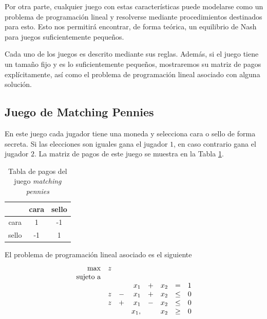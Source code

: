Por otra parte, cualquier juego con estas características puede modelarse como un problema de programación lineal \cite[pp.~228-233]{bib:pl-chvatal} y resolverse mediante procedimientos destinados para esto. Esto nos permitirá encontrar, de forma teórica, un equilibrio de Nash para juegos suficientemente pequeños.

Cada uno de los juegos es descrito mediante sus reglas. Además, si el juego tiene un tamaño fijo y es lo suficientemente pequeños, mostraremos su matriz de pagos explícitamente, así como el problema de programación lineal asociado con alguna solución.

\subsection*{Juego de Matching Pennies}

En este juego cada jugador tiene una moneda y selecciona cara o sello de forma secreta. Si las elecciones son iguales gana el jugador $1$, en caso contrario gana el jugador $2$. La matriz de pagos de este juego se muestra en la Tabla \ref{table:pagos-matching-pennies}.

\begin{table}[ht]
\begin{center}
\caption[Tabla de pagos del juego matching pennies]{Tabla de pagos del juego \textit{matching pennies}}
\label{table:pagos-matching-pennies}
\begin{tabular}{ c | c | c |}
 & cara & sello  \\ \hline
 cara  &  1 & -1 \\ \hline
 sello & -1 &  1 \\ \hline
\end{tabular}
\end{center}
\end{table}

El problema de programación lineal asociado es el siguiente
\begin{equation}
\begin{array}{r r r r r r r r}
\max  & z &  & & & & &\\
\text{sujeto a} \\  
&   &   & x_1  & + & x_2 & = & 1 \\
& z & - & x_1  & + & x_2 & \leq & 0 \\
& z & + & x_1  & - & x_2 & \leq & 0 \\
&   &   & x_1, &   & x_2 & \geq & 0
\end{array}
\end{equation}

